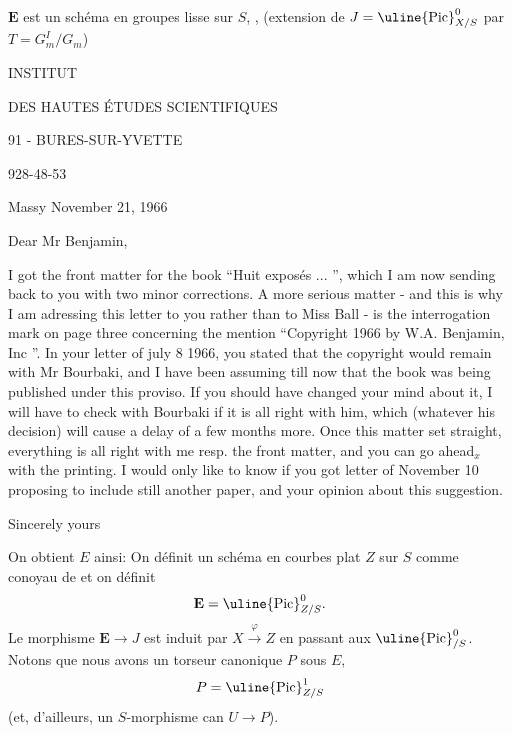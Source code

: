 $\mathbf E$ est un schéma en groupes lisse sur $S$, , (extension de $J=\uline{\mathrm{Pic}}^0_{X/S}$ par $T=G_m^I/G_m$)

INSTITUT

DES HAUTES ÉTUDES SCIENTIFIQUES

91 - BURES-SUR-YVETTE

928-48-53

Massy November 21, 1966

Dear Mr Benjamin,

I got the front matter for the book ``Huit exposés ... '', which I am now sending back to you with two minor corrections. A more serious matter - and this is why I am adressing this letter to you rather than to Miss Ball - is the interrogation mark on page three concerning the mention ``Copyright 1966 by W.A. Benjamin, Inc ''. In your letter of july 8 1966, you stated that the copyright would remain with Mr Bourbaki, and I have been assuming till now that the book was being published under this proviso. If you should have changed your mind about it, I will have to check with Bourbaki if it is all right with him, which (whatever his decision) will cause a delay of a few months more. Once this matter set straight, everything is all right with me resp. the front matter, and you can go ahead$_x$ with the printing. I would only like to know if you got  letter of November 10 proposing to include still another paper, and your opinion about this suggestion.

Sincerely yours


On obtient $E$ ainsi:  On définit un schéma en courbes plat $Z$ sur $S$ comme conoyau de
et on définit
\[
\mathbf E=\uline{\mathrm{Pic}}^0_{Z/S}.
\]
 Le morphisme $\mathbf E\longrightarrow J$ est induit par $X\xrightarrow{\varphi}Z$ en passant aux $\uline{\mathrm{Pic}}^0_{/S}$. Notons que nous avons un torseur canonique $P$ sous $E$,
\[
P=\uline{\mathrm{Pic}}^1_{Z/S}
\]
(et, d'ailleurs, un $S$-morphisme can $U\longrightarrow P$).

